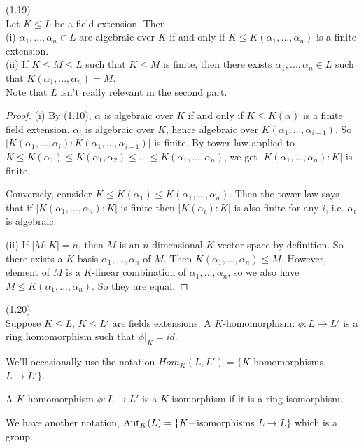 \documentclass[a4paper]{article}
\begin{document}
\begin{lemma} (1.19)\\
Let $K \leq L$ be a field extension. Then\\
(i) $\alpha_1,...,\alpha_n \in L$ are algebraic over $K$ if and only if $K \leq K(\alpha_1,...,\alpha_n)$ is a finite extension.\\
(ii) If $K \leq M \leq L$ such that $K \leq M$ is finite, then there exists $\alpha_1,...,\alpha_n \in L$ such that $K(\alpha_1,...,\alpha_n) = M$.\\
Note that $L$ isn't really relevant in the second part.
\begin{proof}
(i) By (1.10), $\alpha$ is algebraic over $K$ if and only if $K \leq K(\alpha)$ is a finite field extension. $\alpha_i$ is algebraic over $K$, hence algebraic over $K(\alpha_1,...,\alpha_{i-1})$. So $|K(\alpha_1,...,\alpha_i):K(\alpha_1,...,\alpha_{i-1})|$ is finite. By tower law applied to $K \leq K(\alpha_1) \leq K(\alpha_1,\alpha_2) \leq ... \leq K(\alpha_1,...,\alpha_n)$, we get $|K(\alpha_1,...,\alpha_n):K|$ is finite.

Conversely, consider $K \leq K(\alpha_1)\leq K(\alpha_1,...,\alpha_n)$. Then the tower law says that if $|K(\alpha_1,...,\alpha_n) :K|$ is finite then $|K(\alpha_i):K|$ is also finite for any $i$, i.e. $\alpha_i$ is algebraic.

(ii) If $|M:K|=n$, then $M$ is an $n$-dimensional $K$-vector space by definition. So there exists a $K$-basis $\alpha_1,...,\alpha_n$ of $M$. Then $K(\alpha_1,...,\alpha_n) \leq M$. However, element of $M$ is a $K$-linear combination of $\alpha_1,...,\alpha_n$, so we also have $M \leq K(\alpha_1,...,\alpha_n)$. So they are equal.
\end{proof}
\end{lemma}

\begin{defi} (1.20)\\
Suppose $K \leq L$, $K \leq L'$ are fields extensions. A $K$-homomorphism: $\phi: L \to L'$ is a ring homomorphism such that $\phi|_K = id$.
\end{defi}

We'll occasionally use the notation $Hom_K(L,L') = \{K$-homomorphisms $L \to L'\}$.

A $K$-homomorphism $\phi:L \to L'$ is a $K$-isomorphism if it is a ring isomorphism.

We have another notation, $\operatorname{Aut}_K(L) = \{K-$isomorphisms $L \to L\}$ which is a group.
\end{document}
